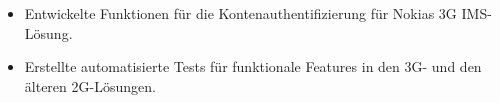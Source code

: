 \begin{itemize}
  \item Entwickelte Funktionen für die Kontenauthentifizierung für Nokias 3G IMS-Lösung.
  \item Erstellte automatisierte Tests für funktionale Features in den 3G- und den älteren 2G-Lösungen.
\end{itemize}
\divider
